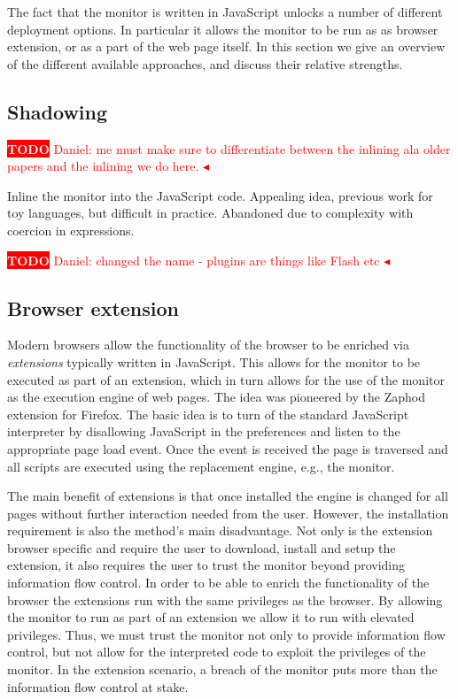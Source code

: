 \documentclass{llncs}
\newcommand{\todo}[1]{\colorbox{red}{\textcolor{white}{\sffamily\bfseries\scriptsize TODO}} \textcolor{red}{#1} \textcolor{red}{$\blacktriangleleft$}}
\begin{document}
The fact that the monitor is written in JavaScript unlocks a number of
different deployment options. In particular it allows the monitor to be run as
as browser extension, or as a part of the web page itself.  In this section we
give an overview of the different available approaches, and discuss their
relative strengths.


\subsection{Shadowing}
\todo{Daniel: me must make sure to differentiate between the inlining ala older papers and the inlining we do here.}

Inline the monitor into the JavaScript code. Appealing idea, previous work for 
toy languages, but difficult in practice. Abandoned due to complexity with 
coercion in expressions.


\todo{Daniel: changed the name - plugins are things like Flash etc}
\subsection{Browser extension}
%
Modern browsers allow the functionality of the browser to be enriched via
\emph{extensions} typically written in JavaScript. This allows for the monitor
to be executed as part of an extension, which in turn allows for the use of the
monitor as the execution engine of web pages. The idea was pioneered by the
Zaphod\cite{Zaphod} extension for Firefox.  The basic idea is to turn of the
standard JavaScript interpreter by disallowing JavaScript in the preferences
and listen to the appropriate page load event. Once the event is received the
page is traversed and all scripts are executed using the replacement engine,
e.g., the monitor. 

The main benefit of extensions is that once installed the engine is changed for
all pages without further interaction needed from the user. However, the
installation requirement is also the method's main disadvantage. Not only is
the extension browser specific and require the user to download, install and
setup the extension, it also requires the user to trust the monitor beyond
providing information flow control. In order to be able to enrich the
functionality of the browser the extensions run with the same privileges as the
browser. By allowing the monitor to run as part of an extension we allow it to
run with elevated privileges. Thus, we must trust the monitor not only to
provide information flow control, but not allow for the interpreted code to
exploit the privileges of the monitor. In the extension scenario, a breach of
the monitor puts more than the information flow control at stake.
\end{document}
